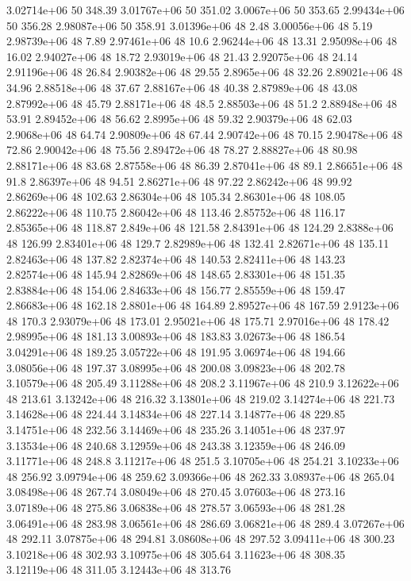 3.02714e+06 50 348.39
3.01767e+06 50 351.02
3.0067e+06 50 353.65
2.99434e+06 50 356.28
2.98087e+06 50 358.91
3.01396e+06 48 2.48
3.00056e+06 48 5.19
2.98739e+06 48 7.89
2.97461e+06 48 10.6
2.96244e+06 48 13.31
2.95098e+06 48 16.02
2.94027e+06 48 18.72
2.93019e+06 48 21.43
2.92075e+06 48 24.14
2.91196e+06 48 26.84
2.90382e+06 48 29.55
2.8965e+06 48 32.26
2.89021e+06 48 34.96
2.88518e+06 48 37.67
2.88167e+06 48 40.38
2.87989e+06 48 43.08
2.87992e+06 48 45.79
2.88171e+06 48 48.5
2.88503e+06 48 51.2
2.88948e+06 48 53.91
2.89452e+06 48 56.62
2.8995e+06 48 59.32
2.90379e+06 48 62.03
2.9068e+06 48 64.74
2.90809e+06 48 67.44
2.90742e+06 48 70.15
2.90478e+06 48 72.86
2.90042e+06 48 75.56
2.89472e+06 48 78.27
2.88827e+06 48 80.98
2.88171e+06 48 83.68
2.87558e+06 48 86.39
2.87041e+06 48 89.1
2.86651e+06 48 91.8
2.86397e+06 48 94.51
2.86271e+06 48 97.22
2.86242e+06 48 99.92
2.86269e+06 48 102.63
2.86304e+06 48 105.34
2.86301e+06 48 108.05
2.86222e+06 48 110.75
2.86042e+06 48 113.46
2.85752e+06 48 116.17
2.85365e+06 48 118.87
2.849e+06 48 121.58
2.84391e+06 48 124.29
2.8388e+06 48 126.99
2.83401e+06 48 129.7
2.82989e+06 48 132.41
2.82671e+06 48 135.11
2.82463e+06 48 137.82
2.82374e+06 48 140.53
2.82411e+06 48 143.23
2.82574e+06 48 145.94
2.82869e+06 48 148.65
2.83301e+06 48 151.35
2.83884e+06 48 154.06
2.84633e+06 48 156.77
2.85559e+06 48 159.47
2.86683e+06 48 162.18
2.8801e+06 48 164.89
2.89527e+06 48 167.59
2.9123e+06 48 170.3
2.93079e+06 48 173.01
2.95021e+06 48 175.71
2.97016e+06 48 178.42
2.98995e+06 48 181.13
3.00893e+06 48 183.83
3.02673e+06 48 186.54
3.04291e+06 48 189.25
3.05722e+06 48 191.95
3.06974e+06 48 194.66
3.08056e+06 48 197.37
3.08995e+06 48 200.08
3.09823e+06 48 202.78
3.10579e+06 48 205.49
3.11288e+06 48 208.2
3.11967e+06 48 210.9
3.12622e+06 48 213.61
3.13242e+06 48 216.32
3.13801e+06 48 219.02
3.14274e+06 48 221.73
3.14628e+06 48 224.44
3.14834e+06 48 227.14
3.14877e+06 48 229.85
3.14751e+06 48 232.56
3.14469e+06 48 235.26
3.14051e+06 48 237.97
3.13534e+06 48 240.68
3.12959e+06 48 243.38
3.12359e+06 48 246.09
3.11771e+06 48 248.8
3.11217e+06 48 251.5
3.10705e+06 48 254.21
3.10233e+06 48 256.92
3.09794e+06 48 259.62
3.09366e+06 48 262.33
3.08937e+06 48 265.04
3.08498e+06 48 267.74
3.08049e+06 48 270.45
3.07603e+06 48 273.16
3.07189e+06 48 275.86
3.06838e+06 48 278.57
3.06593e+06 48 281.28
3.06491e+06 48 283.98
3.06561e+06 48 286.69
3.06821e+06 48 289.4
3.07267e+06 48 292.11
3.07875e+06 48 294.81
3.08608e+06 48 297.52
3.09411e+06 48 300.23
3.10218e+06 48 302.93
3.10975e+06 48 305.64
3.11623e+06 48 308.35
3.12119e+06 48 311.05
3.12443e+06 48 313.76
